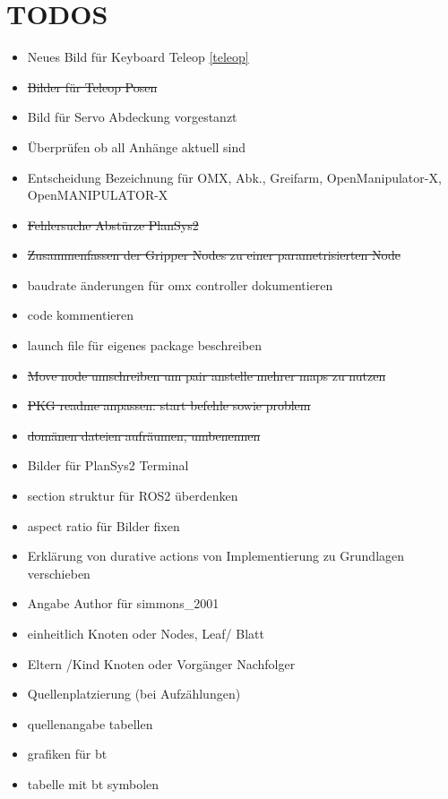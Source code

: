 \section{TODOS}
\begin{itemize}
    \item Neues Bild für Keyboard Teleop \ref{teleop}
    \item \sout{Bilder für Teleop Posen}
    \item Bild für Servo Abdeckung vorgestanzt
    \item Überprüfen ob all Anhänge aktuell sind
    \item Entscheidung Bezeichnung für OMX, Abk., Greifarm, OpenManipulator-X, OpenMANIPULATOR-X
    \item \sout{Fehlersuche Abstürze PlanSys2}
    \item \sout{Zusammenfassen der Gripper Nodes zu einer parametrisierten Node}
    \item baudrate änderungen für omx controller dokumentieren
    \item code kommentieren
    \item launch file für eigenes package beschreiben
    \item \sout{Move node umschreiben um pair anstelle mehrer maps zu nutzen}
    \item \sout{PKG readme anpassen: start befehle sowie problem}
    \item \sout{domänen dateien aufräumen, umbenennen}
    \item Bilder für PlanSys2 Terminal
    \item section struktur für ROS2 überdenken
    \item aspect ratio für Bilder fixen
    \item Erklärung von durative actions von Implementierung zu Grundlagen verschieben
    \item Angabe Author für simmons\_2001
    \item einheitlich Knoten oder Nodes, Leaf/ Blatt
    \item Eltern /Kind Knoten oder Vorgänger Nachfolger
    \item Quellenplatzierung (bei Aufzählungen)
    \item quellenangabe tabellen
    \item grafiken für bt
    \item tabelle mit bt symbolen
\end{itemize}